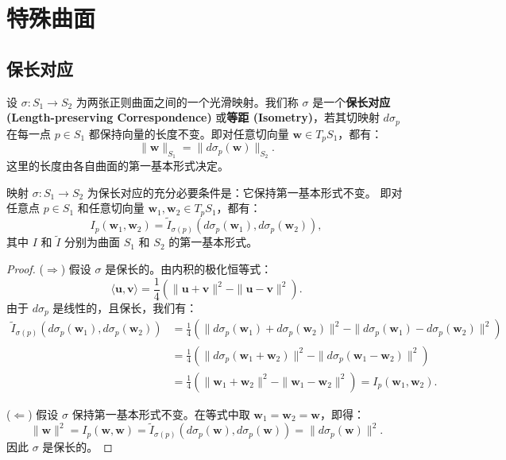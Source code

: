 \documentclass[lang=cn,10pt,thmcnt=section]{elegantbook}
\renewcommand{\vec}[1]{\mathbf{#1}}
\begin{document}
\chapter{特殊曲面}
\section{保长对应}
\begin{definition}[保长对应 / 等距]
    设 $\sigma: S_1 \to S_2$ 为两张正则曲面之间的一个光滑映射。我们称 $\sigma$ 是一个\textbf{保长对应 (Length-preserving Correspondence)} 或\textbf{等距 (Isometry)}，若其切映射 $d\sigma_p$ 在每一点 $p \in S_1$ 都保持向量的长度不变。即对任意切向量 $\vec{w} \in T_p S_1$，都有：
    \[
    \| \vec{w} \|_{S_1} = \| d\sigma_p(\vec{w}) \|_{S_2}.
    \]
    这里的长度由各自曲面的第一基本形式决定。
\end{definition}

\begin{proposition}
    映射 $\sigma: S_1 \to S_2$ 为保长对应的充分必要条件是：它保持第一基本形式不变。
    即对任意点 $p \in S_1$ 和任意切向量 $\vec{w}_1, \vec{w}_2 \in T_p S_1$，都有：
    \[
    I_p(\vec{w}_1, \vec{w}_2) = \widetilde{I}_{\sigma(p)}(d\sigma_p(\vec{w}_1), d\sigma_p(\vec{w}_2)),
    \]
    其中 $I$ 和 $\widetilde{I}$ 分别为曲面 $S_1$ 和 $S_2$ 的第一基本形式。
\end{proposition}
\begin{proof}
    ($\Rightarrow$) 假设 $\sigma$ 是保长的。由内积的极化恒等式：
    \[
    \langle \vec{u}, \vec{v} \rangle = \frac{1}{4}(\|\vec{u}+\vec{v}\|^2 - \|\vec{u}-\vec{v}\|^2).
    \]
    由于 $d\sigma_p$ 是线性的，且保长，我们有：
    \begin{align*}
        \widetilde{I}_{\sigma(p)}(d\sigma_p(\vec{w}_1), d\sigma_p(\vec{w}_2)) &= \frac{1}{4}(\|d\sigma_p(\vec{w}_1)+d\sigma_p(\vec{w}_2)\|^2 - \|d\sigma_p(\vec{w}_1)-d\sigma_p(\vec{w}_2)\|^2) \\
        &= \frac{1}{4}(\|d\sigma_p(\vec{w}_1+\vec{w}_2)\|^2 - \|d\sigma_p(\vec{w}_1-\vec{w}_2)\|^2) \\
        &= \frac{1}{4}(\|\vec{w}_1+\vec{w}_2\|^2 - \|\vec{w}_1-\vec{w}_2\|^2) = I_p(\vec{w}_1, \vec{w}_2).
    \end{align*}
    
    ($\Leftarrow$) 假设 $\sigma$ 保持第一基本形式不变。在等式中取 $\vec{w}_1 = \vec{w}_2 = \vec{w}$，即得：
    \[
    \|\vec{w}\|^2 = I_p(\vec{w}, \vec{w}) = \widetilde{I}_{\sigma(p)}(d\sigma_p(\vec{w}), d\sigma_p(\vec{w})) = \|d\sigma_p(\vec{w})\|^2.
    \]
    因此 $\sigma$ 是保长的。
\end{proof}
\end{document}
